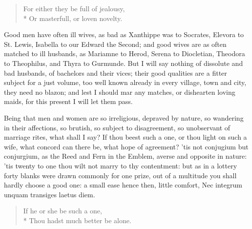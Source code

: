 {\begin{verse}
For either they be full of jealousy,\\*
Or masterfull, or loven novelty.
\end{verse}

Good men have often ill wives, as bad as Xanthippe was to Socrates,
Elevora to St. Lewis, Isabella to our Edward the Second; and good wives
are as often matched to ill husbands, as Mariamne to Herod, Serena to
Diocletian, Theodora to Theophilus, and Thyra to Gurmunde. But I will
say nothing of dissolute and bad husbands, of bachelors and their
vices; their good qualities are a fitter subject for a just volume, too
well known already in every village, town and city, they need no
blazon; and lest I should mar any matches, or dishearten loving maids,
for this present I will let them pass.

Being that men and women are so irreligious, depraved by nature, so
wandering in their affections, so brutish, so subject to disagreement,
so unobservant of marriage rites, what shall I say? If thou beest such
a one, or thou light on such a wife, what concord can there be, what
hope of agreement? 'tis not conjugium but conjurgium, as the Reed and
Fern in the Emblem, averse and opposite in nature: 'tis twenty to
one thou wilt not marry to thy contentment: but as in a lottery forty
blanks were drawn commonly for one prize, out of a multitude you shall
hardly choose a good one: a small ease hence then, little comfort,
Nec integrum unquam transiges laetus diem.

\begin{verse}
If he or she be such a one,\\*
Thou hadst much better be alone.
\end{verse}

}
